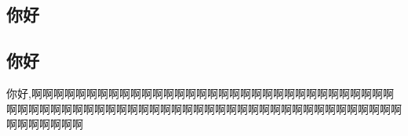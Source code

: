 \documentclass[11pt]{book}
\begin{document}
\begin{CJK}{UTF8}{gbsn}
\CJKindent

\title{}
\author{}
\maketitle

\tableofcontents
\newpage

\chapter{你好}
\section{你好}
你好,啊啊啊啊啊啊啊啊啊啊啊啊啊啊啊啊啊啊啊啊啊啊啊啊啊啊啊啊啊啊啊啊啊啊啊啊啊啊啊啊啊啊啊啊啊啊啊啊啊啊啊啊啊啊啊啊啊啊啊啊啊啊啊啊啊啊啊啊啊啊啊啊啊啊啊啊
\newpage
\end{CJK}
\end{document}
